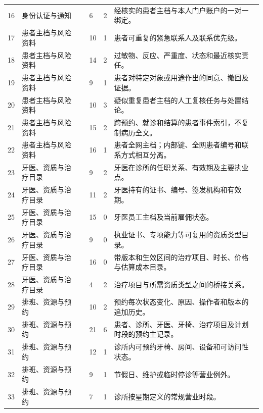 \begin{longtable}{@{}C{8mm}L{27mm}L{42mm}C{10mm}C{10mm}L{49mm}@{}}
16 & 身份认证与通知 &  & 6 & 2 & 经核实的患者主档与本人门户账户的一对一绑定。 \\
17 & 患者主档与风险资料 &  & 10 & 1 & 患者可重复的紧急联系人及联系优先级。 \\
18 & 患者主档与风险资料 &  & 14 & 2 & 过敏物、反应、严重度、状态和最近核实责任。 \\
19 & 患者主档与风险资料 &  & 9 & 1 & 患者对特定对象或用途作出的同意、撤回及证据。 \\
20 & 患者主档与风险资料 &  & 10 & 3 & 疑似重复患者主档的人工复核任务与处置结论。 \\
21 & 患者主档与风险资料 &  & 15 & 2 & 跨预约、就诊和结算的患者事件索引，不复制病历全文。 \\
22 & 患者主档与风险资料 &  & 16 & 1 & 患者全网主档；内部键、全网患者编号和联系方式相互分离。 \\
23 & 牙医、资质与治疗目录 &  & 9 & 2 & 牙医在诊所的任职关系、有效期及主要执业点。 \\
24 & 牙医、资质与治疗目录 &  & 11 & 2 & 牙医持有的证书、编号、签发机构和有效期。 \\
25 & 牙医、资质与治疗目录 &  & 15 & 0 & 牙医员工主档及当前雇佣状态。 \\
26 & 牙医、资质与治疗目录 &  & 9 & 0 & 执业证书、专项能力等可复用的资质类型目录。 \\
27 & 牙医、资质与治疗目录 &  & 16 & 0 & 带版本和生效区间的治疗项目、时长、价格与估算成本目录。 \\
28 & 牙医、资质与治疗目录 &  & 4 & 2 & 治疗项目与所需资质类型之间的桥接关系。 \\
29 & 排班、资源与预约 &  & 10 & 2 & 预约每次状态变化、原因、操作者和版本的追加历史。 \\
30 & 排班、资源与预约 &  & 21 & 6 & 患者、诊所、牙医、牙椅、治疗项目及计划时段的预约主记录。 \\
31 & 排班、资源与预约 &  & 12 & 1 & 诊所内可预约牙椅、房间、设备和可访问性状态。 \\
32 & 排班、资源与预约 &  & 9 & 1 & 节假日、维护或临时停诊等营业例外。 \\
33 & 排班、资源与预约 &  & 7 & 1 & 诊所按星期定义的常规营业时段。 \\

\end{longtable}
